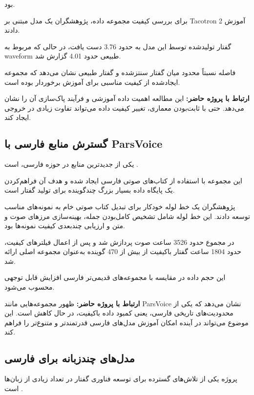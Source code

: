 بود.

برای بررسی کیفیت مجموعه داده، پژوهشگران یک مدل مبتنی بر
Tacotron 2 آموزش دادند.

گفتار تولیدشده توسط این مدل به
حدود 3.76 دست یافت، در حالی که  مربوط به waveform طبیعی
حدود 4.01 گزارش شد.

فاصله نسبتاً محدود میان گفتار سنتزشده و گفتار طبیعی نشان
می‌دهد که مجموعه ایجادشده از کیفیت مناسبی برای آموزش 
برخوردار بوده است.

\textbf{ارتباط با پروژه حاضر:}
این مطالعه اهمیت داده آموزشی و فرآیند پاک‌سازی آن را نشان
می‌دهد.
حتی با ثابت‌بودن معماری، تغییر کیفیت داده می‌تواند تفاوت
زیادی در خروجی ایجاد کند.


\subsection{گسترش منابع فارسی با ParsVoice}

یکی از جدیدترین منابع در حوزه  فارسی،
است
\cite{ranjbar2025parsvoice}.

این مجموعه با استفاده از کتاب‌های صوتی فارسی ایجاد شده و
هدف آن فراهم‌کردن یک پایگاه داده بسیار بزرگ چندگوینده برای
تولید گفتار است.

پژوهشگران یک خط لوله خودکار برای تبدیل کتاب صوتی خام به
نمونه‌های مناسب  توسعه دادند.
این خط لوله شامل تشخیص کامل‌بودن جمله، بهینه‌سازی مرزهای
صوت و متن و ارزیابی چندبعدی کیفیت نمونه‌ها بود.

در مجموع حدود 3526 ساعت صوت پردازش شد و پس از اعمال
فیلترهای کیفیت، حدود 1804 ساعت گفتار باکیفیت از بیش از
470 گوینده به‌عنوان مجموعه اصلی ارائه شد.

این حجم داده در مقایسه با مجموعه‌های قدیمی‌تر فارسی افزایش
قابل توجهی محسوب می‌شود.

\textbf{ارتباط با پروژه حاضر:}
ظهور مجموعه‌هایی مانند ParsVoice نشان می‌دهد که یکی از
محدودیت‌های تاریخی  فارسی، یعنی کمبود داده باکیفیت،
در حال کاهش است.
این موضوع می‌تواند در آینده امکان آموزش مدل‌های فارسی
قدرتمندتر و متنوع‌تر را فراهم کند.


\subsection{مدل‌های چندزبانه  برای فارسی}

پروژه
یکی از تلاش‌های گسترده برای توسعه فناوری گفتار در تعداد
زیادی از زبان‌ها است
\cite{pratap2023mms}.

